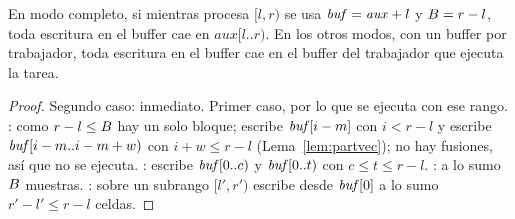 \begin{lema}\label{lem:bufdisj}
En modo completo, si mientras \Quick procesa $[l,r)$ se usa $\mathit{buf}=\mathit{aux}+l$ y
$B=r-l$, toda escritura en el buffer cae en $\mathit{aux}[l..r)$. En los otros modos,
con un buffer por trabajador, toda escritura en el buffer cae en el buffer del
trabajador que ejecuta la tarea.
\end{lema}
\begin{proof}
Segundo caso: inmediato. Primer caso, por lo que se ejecuta con ese rango.
\Part: como $r-l\le B$ hay un solo bloque; \PartBloque escribe $\mathit{buf}[i-m]$ con
$i<r-l$ y \PartVec escribe $\mathit{buf}[i-m..i-m+w)$ con $i+w\le r-l$
(Lema~\ref{lem:partvec}); no hay fusiones, así que \Rotar no se ejecuta. \Hoja: escribe
$\mathit{buf}[0..c)$ y $\mathit{buf}[0..t)$ con $c\le t\le r-l$. \Pivote: a lo sumo $B$ muestras.
\Respaldo: \SymMerge sobre un subrango $[l',r')$ escribe desde $\mathit{buf}[0]$ a lo sumo
$r'-l'\le r-l$ celdas.
\end{proof}

